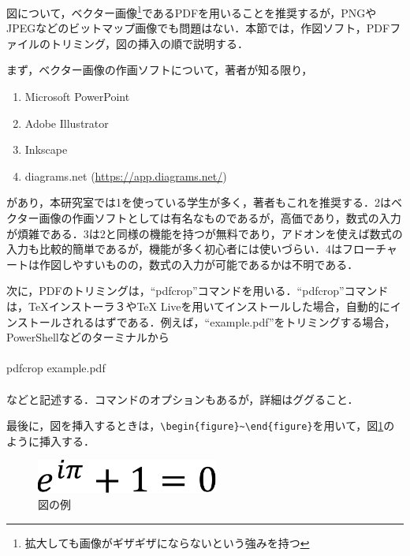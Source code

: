 \documentclass[11pt,a4paper]{jsarticle}
\begin{document}
図について，ベクター画像\footnote{拡大しても画像がギザギザにならないという強みを持つ}であるPDFを用いることを推奨するが，PNGやJPEGなどのビットマップ画像でも問題はない．本節では，作図ソフト，PDFファイルのトリミング，図の挿入の順で説明する．

まず，ベクター画像の作画ソフトについて，著者が知る限り，
\begin{enumerate} %
  \item Microsoft PowerPoint
  \item Adobe Illustrator
  \item Inkscape
  \item diagrams.net (\url{https://app.diagrams.net/})
\end{enumerate}
があり，本研究室では1を使っている学生が多く，著者もこれを推奨する．2はベクター画像の作画ソフトとしては有名なものであるが，高価であり，数式の入力が煩雑である．3は2と同様の機能を持つが無料であり，アドオンを使えば数式の入力も比較的簡単であるが，機能が多く初心者には使いづらい．4はフローチャートは作図しやすいものの，数式の入力が可能であるかは不明である．

次に，PDFのトリミングは，``pdfcrop''コマンドを用いる．``pdfcrop''コマンドは，TeXインストーラ３やTeX Liveを用いてインストールした場合，自動的にインストールされるはずである．例えば，``example.pdf''をトリミングする場合，PowerShellなどのターミナルから
\\\hrulefill\\
pdfcrop example.pdf\\
\hrulefill\\
などと記述する．コマンドのオプションもあるが，詳細はググること．

最後に，図を挿入するときは，\verb|\begin{figure}~\end{figure}|を用いて，図\ref{fig:example-image}のように挿入する．

\begin{figure}[hbtp]
  \centering %
  \includegraphics[width=6cm]{example-crop.pdf} %
  \caption{図の例} %
  \label{fig:example-image} %
\end{figure}
\end{document}
